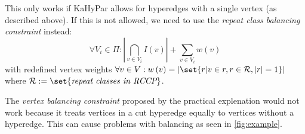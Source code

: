 \documentclass{article}
\DeclarePairedDelimiter\set\{\}
\begin{document}
	This only works if KaHyPar allows for hyperedges with a single vertex (as described above). If this is not allowed, we need to use the \textit{repeat class balancing constraint} instead: \[ \forall V_i \in \Pi: \left|\bigcap_{v \in V_i}I\left(v\right)\right| + \sum_{v \in V_i}w\left(v\right) \] with redefined vertex weights $\forall v \in V: w\left(v\right)=\left|\set{r | v \in r, r \in \mathcal{R}, \left|r\right|=1} \right|$ where $\mathcal{R} := \set{\textit{repeat classes in RCCP}}$.
	
	The \textit{vertex balancing constraint} proposed by the practical explenation would not work because it treats vertices in a cut hyperedge equally to vertices without a hyperedge. This can cause problems with balancing as seen in \cref{fig:example}.
\end{document}
